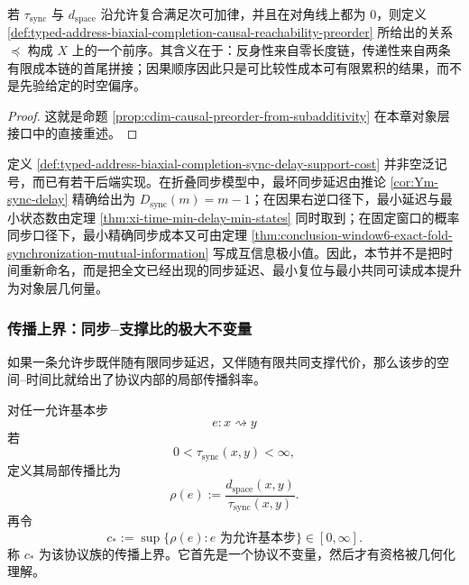 \begin{proposition}[同步与共同支撑诱导前序]\label{prop:typed-address-biaxial-completion-causal-preorder}
若 \(\tau_{\mathrm{sync}}\) 与 \(d_{\mathrm{space}}\) 沿允许复合满足次可加律，并且在对角线上都为 \(0\)，则定义 \ref{def:typed-address-biaxial-completion-causal-reachability-preorder} 所给出的关系 \(\preceq\) 构成 \(X\) 上的一个前序。其含义在于：反身性来自零长度链，传递性来自两条有限成本链的首尾拼接；因果顺序因此只是可比较性成本可有限累积的结果，而不是先验给定的时空偏序。
\end{proposition}
\begin{proof}
这就是命题 \ref{prop:cdim-causal-preorder-from-subadditivity} 在本章对象层接口中的直接重述。
\end{proof}

\begin{remark}[当前稿件中的同步接口]\label{rem:typed-address-biaxial-completion-sync-existing-interfaces}
定义 \ref{def:typed-address-biaxial-completion-sync-delay-support-cost} 并非空泛记号，而已有若干后端实现。在折叠同步模型中，最坏同步延迟由推论 \ref{cor:Ym-sync-delay} 精确给出为 \(D_{\mathrm{sync}}(m)=m-1\)；在因果右逆口径下，最小延迟与最小状态数由定理 \ref{thm:xi-time-min-delay-min-states} 同时取到；在固定窗口的概率同步口径下，最小精确同步成本又可由定理 \ref{thm:conclusion-window6-exact-fold-synchronization-mutual-information} 写成互信息极小值。因此，本节并不是把时间重新命名，而是把全文已经出现的同步延迟、最小复位与最小共同可读成本提升为对象层几何量。
\end{remark}

\subsubsection{传播上界：同步--支撑比的极大不变量}\label{subsubsec:typed-address-biaxial-completion-propagation-bound}
如果一条允许步既伴随有限同步延迟，又伴随有限共同支撑代价，那么该步的空间--时间比就给出了协议内部的局部传播斜率。

\begin{definition}[局部传播比与传播上界]\label{def:typed-address-biaxial-completion-local-propagation-ratio}
对任一允许基本步
\[
e:x\rightsquigarrow y
\]
若
\[
0<\tau_{\mathrm{sync}}(x,y)<\infty,
\]
定义其局部传播比为
\[
\rho(e):=\frac{d_{\mathrm{space}}(x,y)}{\tau_{\mathrm{sync}}(x,y)}.
\]
再令
\[
c_*:=\sup\{\rho(e):e\text{ 为允许基本步}\}\in[0,\infty].
\]
称 \(c_*\) 为该协议族的传播上界。它首先是一个协议不变量，然后才有资格被几何化理解。
\end{definition}

